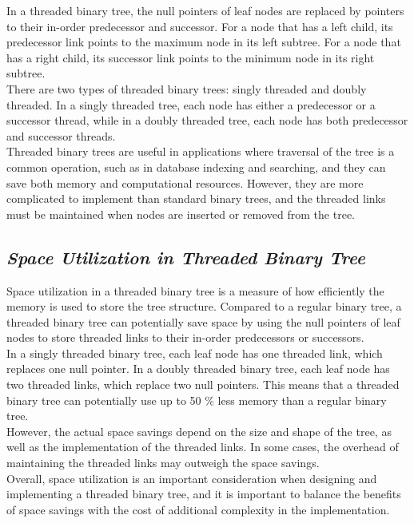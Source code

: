 \documentclass{article}
\begin{document}
In a threaded binary tree, the null pointers of leaf nodes are replaced by pointers to their in-order predecessor and successor. For a node that has a left child, its predecessor link points to the maximum node in its left subtree. For a node that has a right child, its successor link points to the minimum node in its right subtree.\\

There are two types of threaded binary trees: singly threaded and doubly threaded. In a singly threaded tree, each node has either a predecessor or a successor thread, while in a doubly threaded tree, each node has both predecessor and successor threads.\\

Threaded binary trees are useful in applications where traversal of the tree is a common operation, such as in database indexing and searching, and they can save both memory and computational resources. However, they are more complicated to implement than standard binary trees, and the threaded links must be maintained when nodes are inserted or removed from the tree.
\subsection{\textbf{\textit{Space Utilization in Threaded Binary Tree}}}
Space utilization in a threaded binary tree is a measure of how efficiently the memory is used to store the tree structure. Compared to a regular binary tree, a threaded binary tree can potentially save space by using the null pointers of leaf nodes to store threaded links to their in-order predecessors or successors.\\

In a singly threaded binary tree, each leaf node has one threaded link, which replaces one null pointer. In a doubly threaded binary tree, each leaf node has two threaded links, which replace two null pointers. This means that a threaded binary tree can potentially use up to 50 \%  less memory than a regular binary tree.\\

However, the actual space savings depend on the size and shape of the tree, as well as the implementation of the threaded links. In some cases, the overhead of maintaining the threaded links may outweigh the space savings.\\

Overall, space utilization is an important consideration when designing and implementing a threaded binary tree, and it is important to balance the benefits of space savings with the cost of additional complexity in the implementation.
\end{document}
